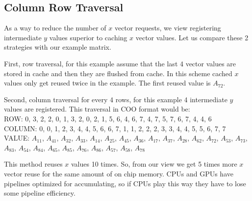 \subsection{Column Row Traversal}
\label{sec:colrow}
    As a way to reduce the number of $x$ vector requests, we view registering intermediate $y$ values superior to caching $x$ vector values. Let us compare these 2 strategies with our example matrix. \par
First, row traversal, for this example assume that the last 4 vector values are stored in cache and then they are flushed from cache. In this scheme cached $x$ values only get reused twice in the example. The first reused value is $A_{72}$. \par
Second, column traversal for every 4 rows, for this example 4 intermediate $y$ values are registered. This traversal in COO format would be:\\
ROW: 0, 3, 2, 2, 0, 1, 3, 2, 0, 2, 1, 5, 6, 4, 6, 7, 4, 7, 5, 7, 6, 7, 4, 4, 6\\
COLUMN: 0, 0, 1, 2, 3, 4, 4, 5, 6, 6, 7, 1, 1, 2, 2, 2, 3, 3, 4, 4, 5, 5, 6, 7, 7\\
VALUE: $A_{11}$, $A_{41}$, $A_{32}$, $A_{33}$, $A_{14}$, $A_{25}$, $A_{45}$, $A_{36}$, $A_{17}$, $A_{37}$, $A_{28}$, $A_{62}$, $A_{72}$, $A_{53}$, $A_{73}$, $A_{83}$, $A_{54}$, $A_{84}$, $A_{65}$, $A_{85}$, $A_{76}$, $A_{86}$, $A_{57}$, $A_{58}$, $A_{78}$\par
This method reuses $x$ values 10 times. So, from our view we get 5 times more $x$ vector reuse for the same amount of on chip memory. CPUs and GPUs have pipelines optimized for accumulating, so if CPUs play this way they have to lose some pipeline efficiency.
